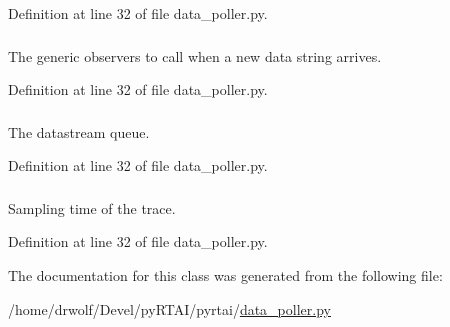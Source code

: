 \-Definition at line 32 of file data\-\_\-poller.\-py.

\hypertarget{classpyrtai_1_1data__poller_1_1_data_poller_ae072250fdb6ecbf735eb65527d03c379}{
\subsubsection[{observers}]{}}
\label{classpyrtai_1_1data__poller_1_1_data_poller_ae072250fdb6ecbf735eb65527d03c379}


\-The generic observers to call when a new data string arrives. 



\-Definition at line 32 of file data\-\_\-poller.\-py.

\hypertarget{classpyrtai_1_1data__poller_1_1_data_poller_a0ce1219ca4c15a18ea8a0c7c18fa021b}{
\subsubsection[{queue}]{}}
\label{classpyrtai_1_1data__poller_1_1_data_poller_a0ce1219ca4c15a18ea8a0c7c18fa021b}


\-The datastream queue. 



\-Definition at line 32 of file data\-\_\-poller.\-py.

\hypertarget{classpyrtai_1_1data__poller_1_1_data_poller_a8e9f007aa9f89f257feef4c6b7c561fb}{
\subsubsection[{sample\-\_\-time}]{}}
\label{classpyrtai_1_1data__poller_1_1_data_poller_a8e9f007aa9f89f257feef4c6b7c561fb}


\-Sampling time of the trace. 



\-Definition at line 32 of file data\-\_\-poller.\-py.



\-The documentation for this class was generated from the following file\-:\begin{DoxyCompactItemize}
\item 
/home/drwolf/\-Devel/py\-R\-T\-A\-I/pyrtai/\hyperlink{data__poller_8py}{data\-\_\-poller.\-py}\end{DoxyCompactItemize}
